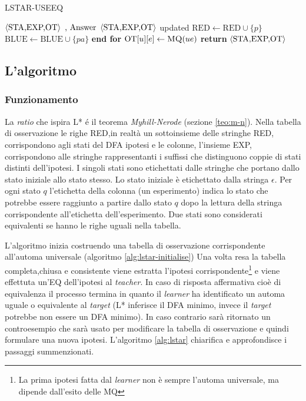 \begin{algorithm}
\caption{LSTAR-USEEQ}\label{alg:lstar-useeq}
\begin{algorithmic}[1]
\Statex
\Input $\Braket{\text{STA,EXP,OT}} \text{ ,  Answer}$
\Output $\Braket{\text{STA,EXP,OT}}$ updated
     \State $\text{RED} \gets \text{RED} \cup \{p\}$
      $\text{BLUE} \gets \text{BLUE} \cup \{pa\}$ 
     \EndFor 
\EndFor
\State \textbf{end for}
 $\text{OT}[u][e] \gets \Call{MQ}{ue}$
\EndFor
\State \textbf{return} $\Braket{\text{STA,EXP,OT}}$
\end{algorithmic}
\end{algorithm}

\subsection{L'algoritmo}
\subsubsection{Funzionamento}La \textit{ratio} che ispira L* é il teorema \textit{Myhill-Nerode} (sezione \ref{teo:m-n}). Nella tabella di osservazione le righe RED,in realtà un sottoinsieme delle stringhe RED, corrispondono agli stati del DFA ipotesi e le colonne, l'insieme EXP, corrispondono alle stringhe rappresentanti i suffissi che distinguono coppie di stati distinti dell'ipotesi. I singoli stati sono etichettati dalle stringhe che portano dallo stato iniziale allo stato stesso. Lo stato iniziale è etichettato dalla stringa $\epsilon$. Per ogni stato $q$ l'etichetta della colonna (un esperimento) indica lo stato che potrebbe essere raggiunto a partire dallo stato $q$ dopo la lettura della stringa corrispondente all'etichetta dell'esperimento. Due stati sono considerati equivalenti se hanno le righe uguali nella tabella.

L'algoritmo inizia costruendo una tabella di osservazione corrispondente all'automa universale (algoritmo \ref{alg:lstar-initialise})
Una volta resa la tabella completa,chiusa e consistente viene estratta l'ipotesi corrispondente\footnote{La prima ipotesi fatta dal \textit{learner} non è sempre l'automa universale, ma dipende dall'esito delle \ac{MQ}} e viene effettuta un'\ac{EQ} dell'ipotesi al \textit{teacher}. In caso di risposta affermativa cioè di equivalenza il processo termina in quanto il \textit{learner} ha identificato un automa uguale o equivalente al \textit{target} (L* inferisce il DFA minimo, invece il \textit{target} potrebbe non essere un DFA minimo). In caso contrario sarà ritornato un controesempio che sarà usato per modificare la tabella di osservazione e quindi formulare una nuova ipotesi. L'algoritmo \ref{alg:lstar} chiarifica e approfondisce i passaggi summenzionati.


